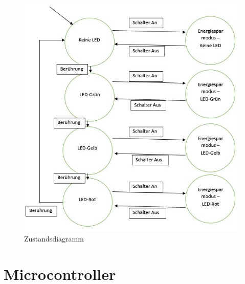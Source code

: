 \documentclass[a4paper,
DIV=13,
12pt,
BCOR=10mm,
department=FakEI,
parskip=half,
automark,
]{article}
\begin{document}
\begin{figure}[!hbpt]
 \begin{center} \includegraphics[width=1.1\textwidth]{Zustandsdiagramm.jpg}
 \caption{Zustandsdiagramm}
 \label{fig:Register2}
  \end{center}
\end{figure}



\newpage
\section{Microcontroller}
\end{document}
